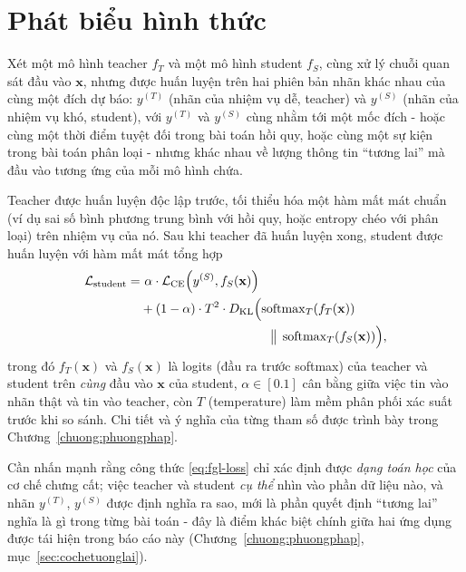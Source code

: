 \section{Phát biểu hình thức}

Xét một mô hình teacher $f_T$ và một mô hình student $f_S$, cùng xử lý chuỗi quan sát đầu vào
$\mathbf{x}$, nhưng được huấn luyện trên hai phiên bản nhãn khác nhau của cùng một đích dự
báo: $y^{(T)}$ (nhãn của nhiệm vụ dễ, teacher) và $y^{(S)}$ (nhãn của nhiệm vụ khó, student),
với $y^{(T)}$ và $y^{(S)}$ cùng nhằm tới một mốc đích - hoặc cùng một thời điểm tuyệt đối
trong bài toán hồi quy, hoặc cùng một sự kiện trong bài toán phân loại - nhưng khác nhau về
lượng thông tin ``tương lai'' mà đầu vào tương ứng của mỗi mô hình chứa.

Teacher được huấn luyện độc lập trước, tối thiểu hóa một hàm mất mát chuẩn (ví dụ sai số bình
phương trung bình với hồi quy, hoặc entropy chéo với phân loại) trên nhiệm vụ của nó. Sau khi
teacher đã huấn luyện xong, student được huấn luyện với hàm mất mát tổng hợp
\begin{equation}
\begin{split}
	\mathcal{L}_{\text{student}} = &\ \alpha \cdot \mathcal{L}_{\text{CE}}\!\left(y^{(S)}, f_S(\mathbf{x})\right) \\
	&+ (1-\alpha) \cdot T^2 \cdot D_{\mathrm{KL}}\Bigl(\operatorname{softmax}_T\!\left(f_T(\mathbf{x})\right) \\
	&\hspace{3.6cm} \big\|\; \operatorname{softmax}_T\!\left(f_S(\mathbf{x})\right)\Bigr),
\end{split}
	\label{eq:fgl-loss}
\end{equation}
trong đó $f_T(\mathbf{x})$ và $f_S(\mathbf{x})$ là logits (đầu ra trước softmax) của teacher
và student trên \textit{cùng} đầu vào $\mathbf{x}$ của student, $\alpha \in [0.1]$ cân bằng
giữa việc tin vào nhãn thật và tin vào teacher, còn $T$ (temperature) làm mềm phân phối xác
suất trước khi so sánh. Chi tiết và ý nghĩa của từng tham số được trình bày trong
Chương~\ref{chuong:phuongphap}.

Cần nhấn mạnh rằng công thức \eqref{eq:fgl-loss} chỉ xác định được \textit{dạng toán học} của
cơ chế chưng cất; việc teacher và student \textit{cụ thể} nhìn vào phần dữ liệu nào, và nhãn
$y^{(T)}$, $y^{(S)}$ được định nghĩa ra sao, mới là phần quyết định ``tương lai'' nghĩa là gì
trong từng bài toán - đây là điểm khác biệt chính giữa hai ứng dụng được tái hiện trong báo
cáo này (Chương~\ref{chuong:phuongphap}, mục~\ref{sec:cochetuonglai}).

